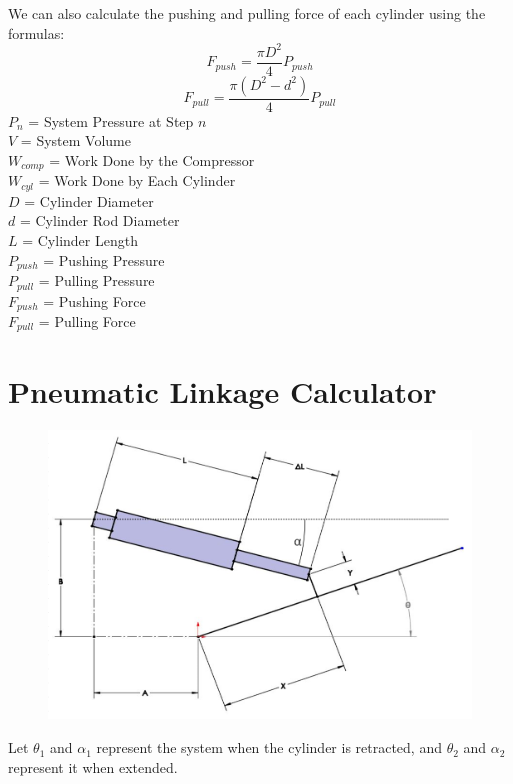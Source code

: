 \documentclass[11pt,a4paper,titlepage]{article}
\begin{document}
	We can also calculate the pushing and pulling force of each cylinder using the formulas:
	\begin{equation}
		F_{push} = \frac{\pi D^2}{4} P_{push}
	\end{equation}
	\begin{equation}
		F_{pull} = \frac{\pi (D^2 - d^2)}{4} P_{pull}
	\end{equation}
	$P_n$ = System Pressure at Step $n$\\
	$V$ = System Volume \\
	$W_{comp}$ = Work Done by the Compressor \\
	$W_{cyl}$ = Work Done by Each Cylinder \\
	$D$ = Cylinder Diameter \\
	$d$ = Cylinder Rod Diameter \\
	$L$ = Cylinder Length \\
	$P_{push}$ = Pushing Pressure \\
	$P_{pull}$ = Pulling Pressure \\
	$F_{push}$ = Pushing Force \\
	$F_{pull}$ = Pulling Force
	
	\newpage
	\section{Pneumatic Linkage Calculator}
	\begin{figure}[H]
		\centering
		\includegraphics[width=0.8\linewidth]{Pneu_Link}
	\end{figure}
	
	Let $\theta_1$ and $\alpha_1$ represent the system when the cylinder is retracted, and $\theta_2$ and $\alpha_2$ represent it when extended. \\ \\
	
\end{document}
